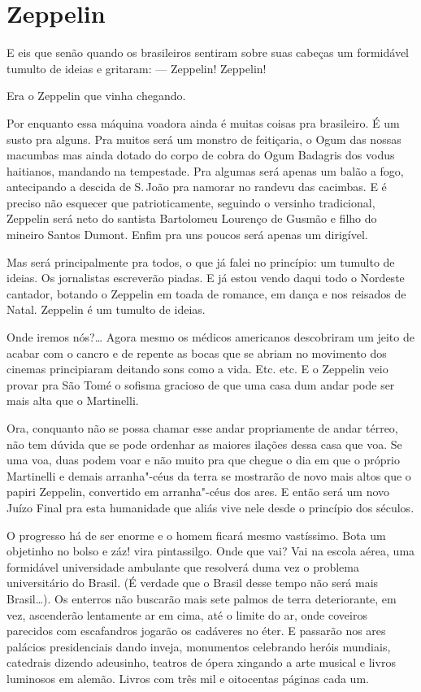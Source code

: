 
\chapter{Zeppelin}

E eis que senão quando os brasileiros sentiram sobre suas cabeças um
formidável tumulto de ideias e gritaram: --- Zeppelin! Zeppelin!

Era o Zeppelin que vinha chegando.

Por enquanto essa máquina voadora ainda é muitas coisas pra brasileiro.
É um susto pra alguns. Pra muitos será um monstro de feitiçaria, o Ogum
das nossas macumbas mas ainda dotado do corpo de cobra do Ogum Badagris
dos vodus haitianos, mandando na tempestade. Pra algumas será apenas um
balão a fogo, antecipando a descida de S.\,João pra namorar no randevu
das cacimbas. E é preciso não esquecer que patrioticamente, seguindo o
versinho tradicional, Zeppelin será neto do santista Bartolomeu Lourenço
de Gusmão e filho do mineiro Santos Dumont. Enfim pra uns poucos será
apenas um dirigível.

Mas será principalmente pra todos, o que já falei no princípio: um
tumulto de ideias. Os jornalistas escreverão piadas. E já estou vendo
daqui todo o Nordeste cantador, botando o Zeppelin em toada de romance,
em dança e nos reisados de Natal. Zeppelin é um tumulto de ideias.

Onde iremos nós?\ldots{} Agora mesmo os médicos americanos descobriram um
jeito de acabar com o cancro e de repente as bocas que se abriam no
movimento dos cinemas principiaram deitando sons como a vida. Etc. etc.
E o Zeppelin veio provar pra São Tomé o sofisma gracioso de que uma casa
dum andar pode ser mais alta que o Martinelli.

Ora, conquanto não se possa chamar esse andar propriamente de andar
térreo, não tem dúvida que se pode ordenhar as maiores ilações dessa
casa que voa. Se uma voa, duas podem voar e não muito pra que chegue o
dia em que o próprio Martinelli e demais arranha"-céus da terra se
mostrarão de novo mais altos que o papiri Zeppelin, convertido em
arranha"-céus dos ares. E então será um novo Juízo Final pra esta
humanidade que aliás vive nele desde o princípio dos séculos.

O progresso há de ser enorme e o homem ficará mesmo vastíssimo. Bota um
objetinho no bolso e záz! vira pintassilgo. Onde que vai? Vai na escola
aérea, uma formidável universidade ambulante que resolverá duma vez o
problema universitário do Brasil. (É verdade que o Brasil desse tempo
não será mais Brasil\ldots{}). Os enterros não buscarão mais sete palmos de
terra deteriorante, em vez, ascenderão lentamente ar em cima, até o
limite do ar, onde coveiros parecidos com escafandros jogarão os
cadáveres no éter. E passarão nos ares palácios presidenciais dando
inveja, monumentos celebrando heróis mundiais, catedrais dizendo
adeusinho, teatros de ópera xingando a arte musical e livros luminosos
em alemão. Livros com três mil e oitocentas páginas cada um.


